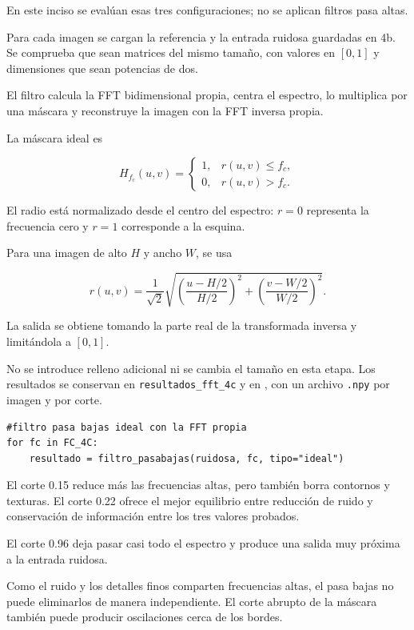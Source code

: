 \documentclass[11pt]{article}
\begin{document}
En este inciso se evalúan esas tres configuraciones;
no se aplican filtros pasa altas.

Para cada imagen se cargan la referencia y la entrada
ruidosa guardadas en 4b. Se comprueba que sean matrices
del mismo tamaño, con valores en $[0,1]$ y dimensiones
que sean potencias de dos.

El filtro calcula la FFT bidimensional propia, centra
el espectro, lo multiplica por una máscara y reconstruye
la imagen con la FFT inversa propia.

La máscara ideal es

\begin{equation}
 H_{f_c}(u,v)
 =
 \begin{cases}
 1, & r(u,v)\leq f_c,\\
 0, & r(u,v)>f_c.
 \end{cases}
\end{equation}

El radio está normalizado desde el centro del espectro:
$r=0$ representa la frecuencia cero y $r=1$ corresponde
a la esquina.

Para una imagen de alto $H$ y ancho $W$, se usa

\begin{equation}
 r(u,v)
 =
 \frac{1}{\sqrt{2}}
 \sqrt{
    \left(\frac{u-H/2}{H/2}\right)^2
    +
    \left(\frac{v-W/2}{W/2}\right)^2
 }.
\end{equation}

La salida se obtiene tomando la parte real de la
transformada inversa y limitándola a $[0,1]$.

No se introduce relleno adicional ni se cambia el tamaño
en esta etapa. Los resultados se conservan en
\texttt{resultados\_fft\_4c} y en
, con un archivo \texttt{.npy}
por imagen y por corte.

\begin{lstlisting}
#filtro pasa bajas ideal con la FFT propia
for fc in FC_4C:
    resultado = filtro_pasabajas(ruidosa, fc, tipo="ideal")
\end{lstlisting}

El corte 0.15 reduce más las frecuencias altas, pero
también borra contornos y texturas. El corte 0.22 ofrece
el mejor equilibrio entre reducción de ruido y
conservación de información entre los tres valores probados.

El corte 0.96 deja pasar casi todo el espectro y produce
una salida muy próxima a la entrada ruidosa.

Como el ruido y los detalles finos comparten frecuencias
altas, el pasa bajas no puede eliminarlos de manera
independiente. El corte abrupto de la máscara también
puede producir oscilaciones cerca de los bordes.
\end{document}

